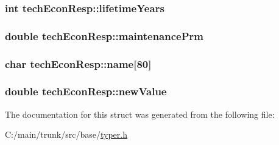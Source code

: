 \label{structtech_econ_resp_a54103fb74eb1e2cc2371121e593bbda8}
\hypertarget{structtech_econ_resp_a4d8720d8e1a825f4b5e92082051e85b8}{
\subsubsection[{lifetimeYears}]{\setlength{\rightskip}{0pt plus 5cm}int {\bf techEconResp::lifetimeYears}}}
\label{structtech_econ_resp_a4d8720d8e1a825f4b5e92082051e85b8}
\hypertarget{structtech_econ_resp_ad6b77834e1e25113103f3846750dd397}{
\subsubsection[{maintenancePrm}]{\setlength{\rightskip}{0pt plus 5cm}double {\bf techEconResp::maintenancePrm}}}
\label{structtech_econ_resp_ad6b77834e1e25113103f3846750dd397}
\hypertarget{structtech_econ_resp_abfd988095eab24fd2fa75ef2a7648587}{
\subsubsection[{name}]{\setlength{\rightskip}{0pt plus 5cm}char {\bf techEconResp::name}\mbox{[}80\mbox{]}}}
\label{structtech_econ_resp_abfd988095eab24fd2fa75ef2a7648587}
\hypertarget{structtech_econ_resp_abe2a6b9862cba8a5e347dd0b99d87a4c}{
\subsubsection[{newValue}]{\setlength{\rightskip}{0pt plus 5cm}double {\bf techEconResp::newValue}}}
\label{structtech_econ_resp_abe2a6b9862cba8a5e347dd0b99d87a4c}


The documentation for this struct was generated from the following file:\begin{DoxyCompactItemize}
\item 
C:/main/trunk/src/base/\hyperlink{typer_8h}{typer.h}\end{DoxyCompactItemize}

